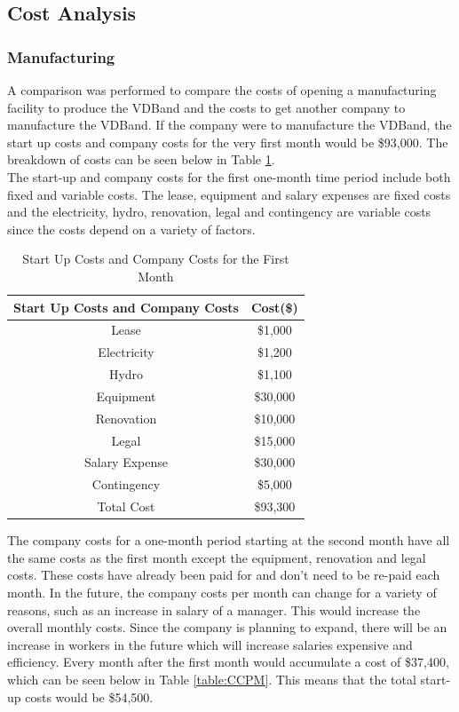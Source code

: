 \documentclass[11.5pt]{article}
\begin{document}
\subsection{Cost Analysis}
\subsubsection{Manufacturing}
A comparison was performed to compare the costs of opening a manufacturing facility to produce the VDBand and the costs to get another company to manufacture the VDBand. If the company were to manufacture the VDBand, the start up costs and company costs for the very first month would be \$93,000. The breakdown of costs can be seen below in Table \ref{table:SCCC}.\\

The start-up and company costs for the first one-month time period include both fixed and variable costs. The lease, equipment and salary expenses are fixed costs and the electricity, hydro, renovation, legal and contingency are variable costs since the costs depend on a variety of factors. 

\begin{table}[H]
	\centering
	\caption{Start Up Costs and Company Costs for the First Month}
	\vspace{3mm}
	\begin{tabular}{cc}
	\hline
		Start Up Costs and Company Costs & Cost(\$) \\
	\hline
		Lease & \$1,000 \\
	    Electricity  & \$1,200 \\
		Hydro & \$1,100\\
		Equipment & \$30,000 \\
		Renovation & \$10,000\\
		Legal & \$15,000 \\
		Salary Expense & \$30,000 \\
		Contingency & \$5,000 \\
		\hline
	    Total Cost & \$93,300 \\
	 \hline 
		\end{tabular}
		\label{table:SCCC}
\end{table}

The company costs for a one-month period starting at the second month have all the same costs as the first month except the equipment, renovation and legal costs. These costs have already been paid for and don’t need to be re-paid each month. In the future, the company costs per month can change for a variety of reasons, such as an increase in salary of a manager. This would increase the overall monthly costs. Since the company is planning to expand, there will be an increase in workers in the future which will increase salaries expensive and efficiency. Every month after the first month would accumulate a cost of \$37,400, which can be seen below in Table \ref{table:CCPM}. This means that the total start-up costs would be \$54,500.
\end{document}
